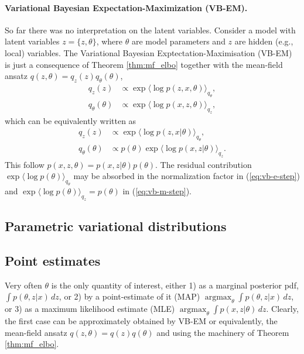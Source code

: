 \paragraph{Variational Bayesian Expectation-Maximization (VB-EM).}So far there was no interpretation on the latent variables. Consider a model with latent variables $z=\{z,\theta\}$, where $\theta$ are model parameters and $z$ are hidden (e.g., local) variables.  The Variational Bayesian Exptectation-Maximisation (VB-EM) \cite{Beal03variationalalgorithms, Bernardo03thevariational}  is just a consequence of Theorem \ref{thm:mf_elbo} together with the mean-field ansatz $q(z,\theta) = q_z(z)q_\theta(\theta)$, 
\begin{align}
q_z(z) &\propto \exp{\langle \log p(z, x, \theta) \rangle_{q_{\theta}}}, \label{eq:vb1-e-step}  \\
q_\theta(\theta) &\propto \exp{\langle \log p(x, z, \theta) \rangle_{q_z}}, \label{eq:vb1-m-step}
\end{align}
which can be equivalently written as
\begin{align}
	q_z(z) &\propto \exp{\langle \log p(z, x | \theta) \rangle_{q_{\theta}}}, \label{eq:vb-e-step}  \\
	q_\theta(\theta) &\propto p(\theta) \exp{\langle \log p(x, z | \theta) \rangle_{q_z}}. \label{eq:vb-m-step}
\end{align}
This follow $p(x,z,\theta) = p(x,z | \theta)p(\theta)$. The residual contribution  $\exp{\langle \log p(\theta) \rangle_{q_{\theta}}}$ may be absorbed in the normalization factor in (\ref{eq:vb-e-step}) and 
$\exp{\langle \log p(\theta) \rangle_{q_{z}}} = p(\theta)$ in (\ref{eq:vb-m-step}). 
  
\subsection{Parametric variational distributions}  
  
\subsection{Point estimates}  
 Very often $\theta$ is the only quantity of interest, either 1) as a marginal posterior pdf, $\int p(\theta, z|x)\,dz$, or 2) by a point-estimate of it (MAP)  $\operatorname{argmax}_\theta \int p(\theta, z|x)\,dz$, or 3) as a maximum likelihood estimate (MLE)  $\operatorname{argmax}_\theta \int p(x, z|\theta)\,dz$.  Clearly, the first case can be approximately obtained by VB-EM or equivalently, the mean-field ansatz $q(z,\theta) = q(z)q(\theta)$ and using the machinery of Theorem \ref{thm:mf_elbo}.
 
